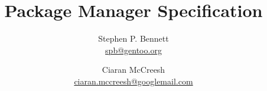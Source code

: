 \documentclass[a4paper]{report}
\title{Package Manager Specification}
\author{Stephen P. Bennett\\\url{spb@gentoo.org}
\and Ciaran McCreesh\\\url{ciaran.mccreesh@googlemail.com}}
\begin{document}
\maketitle

\tableofcontents
\listofalgorithms
\lstlistoflistings
\listoftables
\listoffixmes
































\end{document}
